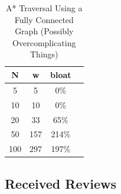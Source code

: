 \begin{table}
    \centering
    \begin{tabular}{|c|c|c|c|}
        \hline
        N & w & bloat \\
        \hline
        5 & 5 & 0\% \\
        10 & 10 & 0\% \\
        20 & 33 & 65\% \\
        50 & 157 & 214\% \\
        100 & 297 & 197\% \\
        \hline
    \end{tabular}
    \caption{A* Traversal Using a Fully Connected Graph (Possibly Overcomplicating Things)}
    \label{tab:astarfullyconnected}
\end{table}

\subsection{Received Reviews}

